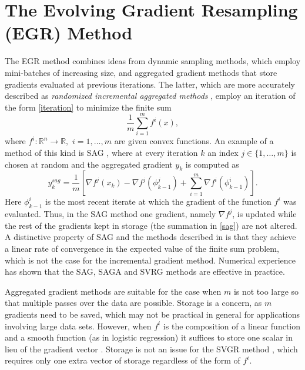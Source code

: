\documentclass[11pt]{article}
\begin{document}
\section{The Evolving Gradient Resampling (EGR) Method}  \label{themethod}
\setcounter{equation}{0}
The EGR method combines ideas from dynamic sampling methods, which  employ mini-batches of increasing size, and  aggregated gradient methods that store gradients evaluated at previous iterations. The latter, which are more accurately described as \emph{randomized incremental aggregated methods}  \cite{roux2012stochastic,johnson2013accelerating,frostig2014competing,NIPS2014_5258}, employ an iteration of the form \eqref{iteration} to minimize the finite sum
\begin{equation}
	\label{saa}
	\frac{1}{m} \sum_{i =1}^m f^i(x),
\end{equation}
where $f^i: \mathbb{R}^n \rightarrow \mathbb{R},$ $i=1, \ldots, m$ are given convex functions. 
An example of a method of this kind is SAG \cite{roux2012stochastic}, where at every iteration $k$ an index $j \in \{1, \ldots, m\}$  is chosen at random and the aggregated gradient $y_k$ is computed as
\begin{equation}   \label{sag} 
     y_k^{sag}= \frac{1}{m} \left[ \nabla f^j(x_k) -  \nabla f^j(\phi_{k-1}^j) + \sum_{i=1}^{m}  \nabla f^i (\phi^i_{k-1}) \right].
     \end{equation}
Here $\phi^i_{k-1}$ is the most recent iterate at which the gradient of the function $f^i$ was evaluated. Thus, in the SAG method one gradient, namely  $\nabla f^j$,  is updated while the rest of the gradients kept in storage (the summation in \eqref{sag}) are not altered. A distinctive property of SAG  and the methods described in  \cite{johnson2013accelerating,NIPS2014_5258,shalev2013stochastic,mairal2015incremental,defazio2014finito} 
is that they achieve a linear rate of convergence in the expected value of the finite sum problem, which is not the case for the incremental gradient method. Numerical experience has shown that the SAG, SAGA \cite{NIPS2014_5258} and SVRG\cite{johnson2013accelerating} methods are effective in practice.

Aggregated gradient methods are suitable for the case when $m$ is not too large so that multiple passes over the data are possible. Storage is a concern, as $m$ gradients need to be saved, which may not be practical in general for applications involving large data sets. However,  when $f^i$ is the composition of a linear function and a smooth function (as in logistic regression) it suffices to store one scalar in lieu of the gradient vector \cite{roux2012stochastic}. Storage is not an issue for the SVGR method \cite{johnson2013accelerating}, which requires only one extra vector of storage regardless of the form of $f^i$.
\end{document}
